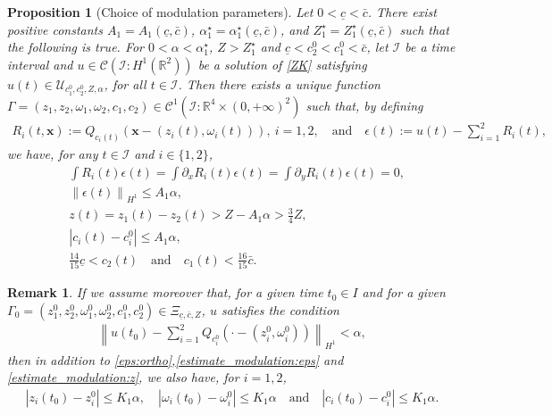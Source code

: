 \documentclass[reqno,10pt]{amsart}
\newtheorem{propo}[lemm]{Proposition}
\newtheorem{rema}[lemm]{Remark}
\numberwithin{equation}{section}
\newcommand{\bx}{\mathbf{x}}
\begin{document}
	
	\begin{propo}[Choice of modulation parameters]\label{propo:choice_mod_param}
		Let $0<\underline{c}<\bar{c}$. There exist positive constants $A_1=A_1(\underline{c},\bar{c})$, $\alpha_1^\star=\alpha_1^\star(\underline{c},\bar{c})$, and $Z_1^\star =Z_1^\star(\underline{c},\bar{c})$ such that the following is true. For $0<\alpha< \alpha_1^\star$, $Z>Z_1^\star$ and $\underline{c}<c_2^0<c_1^0<\bar{c}$, let $\mathcal{I}$ be a time interval and $u\in \mathcal{C}(\mathcal{I} : H^1(\mathbb{R}^2))$ be a solution of \eqref{ZK} satisfying $u(t) \in \mathcal{U}_{c_1^0, c_2^0, Z, \alpha}$, for all $t \in \mathcal{I}$.
		Then there exists a unique function $\Gamma=\left(z_1,z_2,\omega_1,\omega_2,c_1,c_2\right) \in \mathcal{C}^1\left(\mathcal{I} : \mathbb{R}^4 \times (0,+\infty)^2\right)$ such that, by defining
		\begin{align}\label{defi:R_n}
			R_i(t,\bx) := Q_{c_i(t)} \left( \bx - \left( z_i(t), \omega_i(t)\right) \right), \ i=1,2, \quad \text{and} \quad \epsilon(t) :=  u(t) - \sum_{i=1}^2 R_i(t) ,
		\end{align}
		we have, for any $t \in \mathcal{I}$ and $i\in \{ 1,2\}$,
		\begin{align}
			& \int R_i(t) \epsilon(t) = \int \partial_x  R_i(t) \epsilon(t) = \int \partial_y  R_i(t)\epsilon(t) = 0, \label{eps:ortho} \\
			& \left\| \epsilon (t) \right\|_{H^1} \leq A_1 \alpha, \label{estimate_modulation:eps} \\ & z(t)= z_1(t)- z_2(t) > Z - A_1 \alpha>\frac{3}4Z, \label{estimate_modulation:z} \\
			&|c_i(t)-c_i^0| \le A_1 \alpha, \label{estimate_modulation:c} \\
            &  \frac{14}{15}\underline{c} < c_2(t) \quad \text{and} \quad c_1(t) < \frac{16}{15}\bar{c}. \label{estimate_modulation:c:bis}
		\end{align}
	\end{propo}
	
	\begin{toexclude}
    \begin{rema}\label{rema:IFT}
			If we assume moreover that, for a given time $t_0 \in I$ and for a given $\Gamma_0=(z_1^0,z_2^0, \omega_1^0, \omega_2^0, c_1^0, c_2^0) \in \Xi_{\underline{c},\bar{c},Z}$, $u$ satisfies the condition
			\begin{align} \label{tube:t0}
				\left\| u(t_0) - \sum_{i=1}^2 Q_{c_i^0} \left( \cdot -(z_i^0, \omega_i^0) \right) \right\|_{H^1} < \alpha,
			\end{align}
			then in addition to \eqref{eps:ortho},\eqref{estimate_modulation:eps} and \eqref{estimate_modulation:z}, we also have, for $i=1,2$, 
			\begin{align*}
				\left\vert z_i(t_0) -z_i^0\right\vert \leq K_1 \alpha,\quad \left\vert \omega_i(t_0)-\omega_i^0 \right\vert \leq K_1\alpha \quad \text{and} \quad \left\vert c_i(t_0) - c_i^0 \right\vert \leq K_1 \alpha.
			\end{align*}
		\end{rema}
	\end{toexclude}
	
\end{document}
